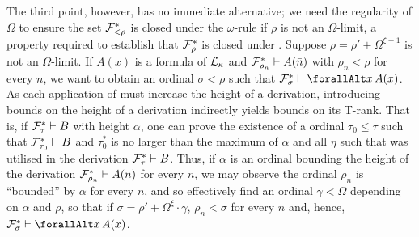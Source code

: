 \documentclass[UKenglish,cleveref,DIV=12]{scrartcl}
\let\forall\forallAlt
\theoremstyle{definition}
\theoremstyle{definition}
\begin{document}
The third point, however, has no immediate alternative; we need the regularity
of $\Omega$ to ensure the set $\mathcal{F}^*_{<\rho}$ is closed under the $\omega$-rule
if $\rho$ is not an $\Omega$-limit, a property required to establish that
$\mathcal{F}^*_\rho$ is closed under \Conec\eta. Suppose
$\rho=\rho'+\Omega^{\xi+1}$ is not an $\Omega$-limit. If $A(x)$ is a formula of
$\mathcal{L}_\kappa$ and $\mathcal{F}^*_{\rho_n}\vdash A(\bar n)$ with $\rho_n<\rho$ for every
$n$, we want to obtain an ordinal $\sigma<\rho$ such that
$\FF^*_\sigma\proves\forall x\, A(x)$.
%
As each application of \Nec\eta must increase the height of a
derivation, introducing bounds on the height of a derivation indirectly yields
bounds on its T-rank. That is, if $\mathcal{F}^*_\tau\vdash B$ with height
$\alpha$, one can prove the existence of a ordinal $\tau_0\le\tau$ such that
$\mathcal{F}^*_{\tau_0}\vdash B$ and $\tau_0^*$ is no larger than the maximum of
$\alpha$ and all $\eta$ such that \Nec\eta was utilised in the
derivation $\mathcal{F}^*_{\tau}\vdash B$. Thus, if $\alpha$ is an ordinal bounding
the height of the derivation $\mathcal{F}^*_{\rho_n}\vdash A(\bar n)$ for every
$n$,
we may observe the ordinal $\rho_n$
is ``bounded'' by $\alpha$ for every $n$, and so effectively find an ordinal $\gamma<\Omega$
depending on $\alpha$ and $\rho$, so that if
$\sigma=\rho'+\Omega^\xi\cdot\gamma$, $\rho_n<\sigma$ for every $n$ and, hence,
$\FF^*_\sigma\proves \forall x\,A(x)$.
\end{document}
